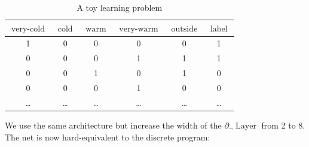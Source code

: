 \documentclass{article} %
\begin{document}
\begin{table}[h!]
	\centering
	\begin{tabular}{|c|c|c|c|c|c|}
		$\operatorname{very-cold}$ & $\operatorname{cold}$ & $\operatorname{warm}$ & $\operatorname{very-warm}$ & $\operatorname{outside}$ & $\operatorname{label}$ \\ \hline
		1 & 0 & 0 & 0 & 0 & 1 \\
		0 & 0 & 0 & 1 & 1 & 1 \\
		0 & 0 & 1 & 0 & 1 & 0 \\
		0 & 0 & 0 & 1 & 0 & 0 \\
		\dots & \dots & \dots & \dots & \dots & \dots
	\end{tabular}
	\caption{A toy learning problem}
	\label{tab:toy2}
\end{table}

We use the same architecture but increase the width of the $\partial_{\neg}\!\operatorname{Layer}$ from 2 to 8. The net is now hard-equivalent to the discrete program:

\end{document}

